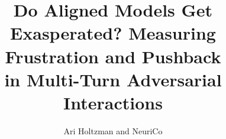 \documentclass{article}
\title{Do Aligned Models Get Exasperated? Measuring Frustration and Pushback\\in Multi-Turn Adversarial Interactions}
\author{Ari Holtzman and NeuriCo}
\begin{document}
\maketitle

\begin{abstract}

\end{abstract}










\end{document}

